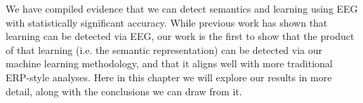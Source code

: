 \label{chapter:discussion}

We have compiled evidence that we can detect semantics and learning using EEG 
with statistically significant accuracy. While previous work has shown that 
learning can be detected via EEG, our work is the first to show that the 
product of that learning (i.e. the semantic representation) can be detected via 
our machine learning methodology, and that it aligns well with more traditional 
ERP-style analyses. Here in this chapter we will explore our results in more 
detail, along with the conclusions we can draw from it.









